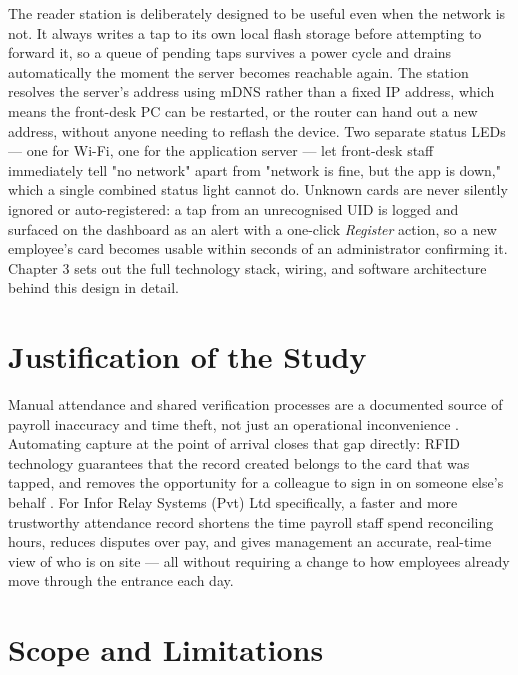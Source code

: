 The reader station is deliberately designed to be useful even when the network is not. It always writes a tap to its own local flash storage before attempting to forward it, so a queue of pending taps survives a power cycle and drains automatically the moment the server becomes reachable again. The station resolves the server's address using mDNS rather than a fixed IP address, which means the front-desk PC can be restarted, or the router can hand out a new address, without anyone needing to reflash the device. Two separate status LEDs — one for Wi-Fi, one for the application server — let front-desk staff immediately tell "no network" apart from "network is fine, but the app is down," which a single combined status light cannot do. Unknown cards are never silently ignored or auto-registered: a tap from an unrecognised UID is logged and surfaced on the dashboard as an alert with a one-click \textit{Register} action, so a new employee's card becomes usable within seconds of an administrator confirming it. Chapter 3 sets out the full technology stack, wiring, and software architecture behind this design in detail.

\section{Justification of the Study}

Manual attendance and shared verification processes are a documented source of payroll inaccuracy and time theft, not just an operational inconvenience \parencite{qandle2025buddy, oloid2025buddy}. Automating capture at the point of arrival closes that gap directly: RFID technology guarantees that the record created belongs to the card that was tapped, and removes the opportunity for a colleague to sign in on someone else's behalf \parencite{shukla2019conceptual}. For Infor Relay Systems (Pvt) Ltd specifically, a faster and more trustworthy attendance record shortens the time payroll staff spend reconciling hours, reduces disputes over pay, and gives management an accurate, real-time view of who is on site — all without requiring a change to how employees already move through the entrance each day.

\section{Scope and Limitations}

